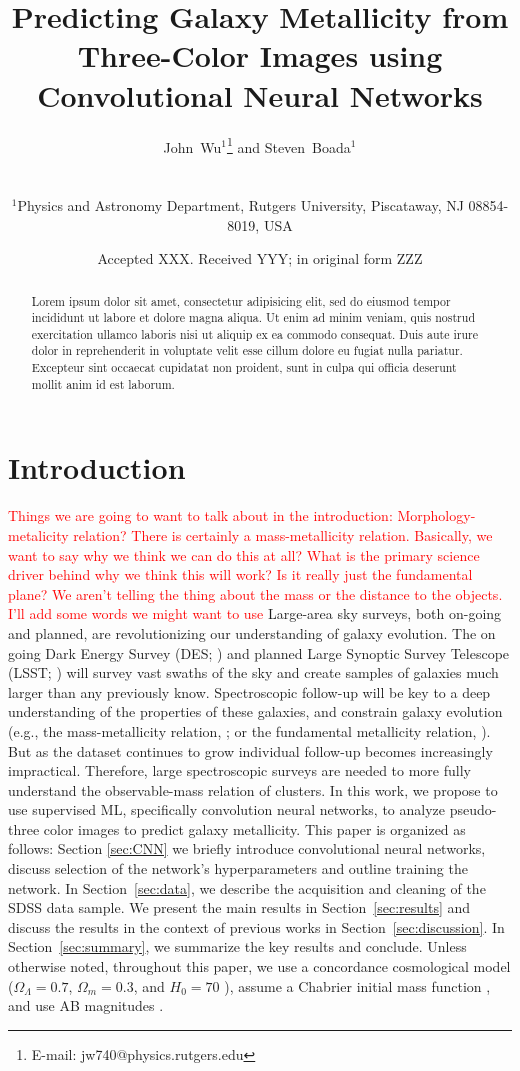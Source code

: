 \documentclass[fleqn,usenatbib]{mnras}
\title[Metallicity with CNNs]{Predicting Galaxy Metallicity from Three-Color Images using Convolutional Neural Networks}
\author[Wu and Boada]
{\parbox{\textwidth}{John~Wu$^{1}$\thanks{E-mail: jw740@physics.rutgers.edu} and
Steven~Boada$^{1}$}\vspace{0.4cm}\
\\
\parbox{\textwidth}{$^{1}$Physics and Astronomy Department, Rutgers University, Piscataway, NJ 08854-8019, USA\\}}
\date{Accepted XXX. Received YYY; in original form ZZZ}
\newcommand{\editorial}[1]{\textcolor{red}{#1}}
\begin{document}
\label{firstpage}
\pagerange{\pageref{firstpage}--\pageref{lastpage}}
\maketitle

\begin{abstract}
\noindent
Lorem ipsum dolor sit amet, consectetur adipisicing elit, sed do eiusmod tempor incididunt ut labore et dolore magna aliqua. Ut enim ad minim veniam, quis nostrud exercitation ullamco laboris nisi ut aliquip ex ea commodo consequat. Duis aute irure dolor in reprehenderit in voluptate velit esse cillum dolore eu fugiat nulla pariatur. Excepteur sint occaecat cupidatat non proident, sunt in culpa qui officia deserunt mollit anim id est laborum.
\end{abstract}

\section{Introduction}\label{sec:introduction}
\editorial{Things we are going to want to talk about in the introduction: Morphology-metalicity relation? There is certainly a mass-metallicity relation. Basically, we want to say why we think we can do this at all? What is the primary science driver behind why we think this will work? Is it really just the fundamental plane? We aren't telling the thing about the mass or the distance to the objects.}
\editorial{I'll add some words we might want to use}
Large-area sky surveys, both on-going and planned, are revolutionizing our understanding of galaxy evolution. The on going Dark Energy Survey (DES; \citealt{DES2005}) and planned Large Synoptic Survey Telescope (LSST; \citealt{LSST2012}) will survey vast swaths of the sky and create samples of galaxies much larger than any previously know. Spectroscopic follow-up will be key to a deep understanding of the properties of these galaxies, and constrain galaxy evolution (e.g., the mass-metallicity relation, \citealt{Tremonti+05}; or the fundamental metallicity relation, \citealt{2010paper,2011paper}). But as the dataset continues to grow individual follow-up becomes increasingly impractical. Therefore, large spectroscopic surveys are needed to more fully understand the observable-mass relation of clusters.
In this work, we propose to use supervised ML, specifically convolution neural networks, to analyze pseudo-three color images to predict galaxy metallicity.
This paper is organized as follows: Section \ref{sec:CNN} we briefly introduce convolutional neural networks, discuss selection of the network's hyperparameters and outline training the network. In Section~\ref{sec:data}, we describe the acquisition and cleaning of the SDSS data sample. We present the main results in Section~\ref{sec:results} and discuss the results in the context of previous works in Section~\ref{sec:discussion}. In Section~\ref{sec:summary}, we summarize the key results and conclude.
Unless otherwise noted, throughout this paper, we use a concordance cosmological model ($\Omega_\Lambda = 0.7$, $\Omega_m = 0.3$, and $H_0= 70$ \kms \mpc), assume a Chabrier initial mass function \citep{Chabrier2003}, and use AB magnitudes \citep{Oke1974}.
\end{document}
